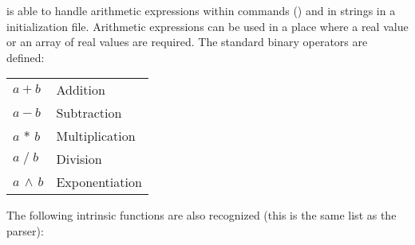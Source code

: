 \tao is able to handle arithmetic expressions within commands () and in strings in a
\tao initialization file.  Arithmetic expressions can be used in a place where a real value or an
array of real values are required.  The standard binary operators are defined: \hfil\break \hspace*{0.15in}
\begin{tabular}{ll}
  $a + b$           & Addition        \\
  $a - b$           & Subtraction     \\
  $a \, \ast \, b$  & Multiplication  \\
  $a \; / \; b$     & Division        \\
  $a \, \land \, b$ & Exponentiation  \\
\end{tabular} \newline
The following intrinsic functions are also recognized (this is the same list as the \bmad parser):
\hfil\break
{}
\hspace*{0.15in}
